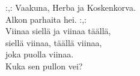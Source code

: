 
            :,: Vaakuna, Herba ja Koskenkorva. \\
            Alkon parhaita hei. :,: \\
            Viinaa siellä ja viinaa täällä, \\
            siellä viinaa, täällä viinaa, \\
            joka puolla viinaa. \\
            Kuka sen pullon vei? \\
